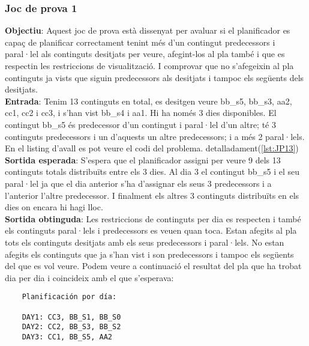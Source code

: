 \documentclass[a4paper]{article}
\begin{document}
	\subsubsection{Joc de prova 1}
	\textbf{Objectiu}: Aquest joc de prova està dissenyat per avaluar si el planificador es capaç de planificar correctament tenint més d'un contingut predecessors i paral·lel als continguts desitjats per veure, afegint-los al pla també i que es respectin les restriccions de visualització. I comprovar que no s'afegeixin al pla continguts ja vists que siguin predecessors als desitjats i tampoc els següents dels desitjats.  \\
	\textbf{Entrada}: Tenim 13 continguts en total, es desitgen veure bb\_s5, bb\_s3, aa2, cc1, cc2 i cc3, i s'han vist bb\_s4 i aa1. Hi ha només 3 dies disponibles. El contingut bb\_s5 és predecessor d'un contingut i paral·lel d'un altre; té 3 continguts predecessors i un d'aquests un altre predecessors; i a més 2 paral·lels. En el listing d'avall es pot veure el codi del problema.  detalladament(\ref{lst:JP13})\\
	\textbf{Sortida esperada}: S'espera que el planificador assigni per veure 9 dels 13 continguts totals distribuïts entre els 3 dies. Al dia 3 el contingut bb\_s5 i el seu paral·lel ja que el dia anterior s'ha d'assignar els seus 3 predecessors i a l'anterior l'altre predecessor. I finalment els altres 3 continguts distribuïts en els dies on encara hi hagi lloc. \\
	\textbf{Sortida obtinguda}:  Les restriccions de continguts per dia es respecten i també els continguts paral·lels i predecessors es veuen quan toca.  Estan afegits al pla tots els continguts desitjats amb els seus predecessors i paral·lels. No estan afegits els continguts que ja s'han vist i son predecessors i tampoc els següents del que es vol veure. Podem veure a continuació el resultat del pla que ha trobat dia per dia i coincideix amb el que s'esperava:
	
	\begin{verbatim}
	Planificación por día:
	
	DAY1: CC3, BB_S1, BB_S0
	DAY2: CC2, BB_S3, BB_S2
	DAY3: CC1, BB_S5, AA2
		
	\end{verbatim}
	
\end{document}
